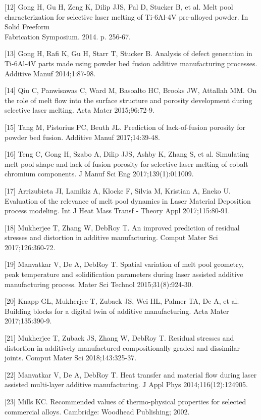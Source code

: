 \documentclass[10pt]{article}
\begin{document}
[12] Gong H, Gu H, Zeng K, Dilip JJS, Pal D, Stucker B, et al. Melt pool characterization for selective laser melting of Ti-6Al-4V pre-alloyed powder. In Solid Freeform\\
Fabrication Symposium. 2014. p. 256-67.

[13] Gong H, Rafi K, Gu H, Starr T, Stucker B. Analysis of defect generation in Ti-6Al-4V parts made using powder bed fusion additive manufacturing processes. Additive Manuf 2014;1:87-98.

[14] Qiu C, Panwisawas C, Ward M, Basoalto HC, Brooks JW, Attallah MM. On the role of melt flow into the surface structure and porosity development during selective laser melting. Acta Mater 2015;96:72-9.

[15] Tang M, Pistorius PC, Beuth JL. Prediction of lack-of-fusion porosity for powder bed fusion. Additive Manuf 2017;14:39-48.

[16] Teng C, Gong H, Szabo A, Dilip JJS, Ashby K, Zhang S, et al. Simulating melt pool shape and lack of fusion porosity for selective laser melting of cobalt chromium components. J Manuf Sci Eng 2017;139(1):011009.

[17] Arrizubieta JI, Lamikiz A, Klocke F, Silvia M, Kristian A, Eneko U. Evaluation of the relevance of melt pool dynamics in Laser Material Deposition process modeling. Int J Heat Mass Transf - Theory Appl 2017;115:80-91.

[18] Mukherjee T, Zhang W, DebRoy T. An improved prediction of residual stresses and distortion in additive manufacturing. Comput Mater Sci 2017;126:360-72.

[19] Manvatkar V, De A, DebRoy T. Spatial variation of melt pool geometry, peak temperature and solidification parameters during laser assisted additive manufacturing process. Mater Sci Technol 2015;31(8):924-30.

[20] Knapp GL, Mukherjee T, Zuback JS, Wei HL, Palmer TA, De A, et al. Building blocks for a digital twin of additive manufacturing. Acta Mater 2017;135:390-9.

[21] Mukherjee T, Zuback JS, Zhang W, DebRoy T. Residual stresses and distortion in additively manufactured compositionally graded and dissimilar joints. Comput Mater Sci 2018;143:325-37.

[22] Manvatkar V, De A, DebRoy T. Heat transfer and material flow during laser assisted multi-layer additive manufacturing. J Appl Phys 2014;116(12):124905.

[23] Mills KC. Recommended values of thermo-physical properties for selected commercial alloys. Cambridge: Woodhead Publishing; 2002.
\end{document}
